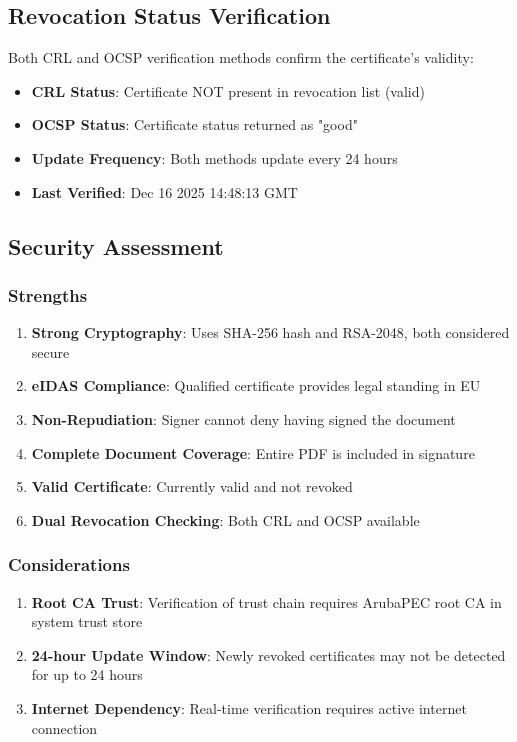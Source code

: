 \documentclass[12pt,a4paper]{article}
\begin{document}
\subsection{Revocation Status Verification}

Both CRL and OCSP verification methods confirm the certificate's validity:

\begin{itemize}
    \item \textbf{CRL Status}: Certificate NOT present in revocation list (valid)
    \item \textbf{OCSP Status}: Certificate status returned as "good"
    \item \textbf{Update Frequency}: Both methods update every 24 hours
    \item \textbf{Last Verified}: Dec 16 2025 14:48:13 GMT
\end{itemize}

\subsection{Security Assessment}

\subsubsection{Strengths}

\begin{enumerate}
    \item \textbf{Strong Cryptography}: Uses SHA-256 hash and RSA-2048, both considered secure
    \item \textbf{eIDAS Compliance}: Qualified certificate provides legal standing in EU
    \item \textbf{Non-Repudiation}: Signer cannot deny having signed the document
    \item \textbf{Complete Document Coverage}: Entire PDF is included in signature
    \item \textbf{Valid Certificate}: Currently valid and not revoked
    \item \textbf{Dual Revocation Checking}: Both CRL and OCSP available
\end{enumerate}

\subsubsection{Considerations}

\begin{enumerate}
    \item \textbf{Root CA Trust}: Verification of trust chain requires ArubaPEC root CA in system trust store
    \item \textbf{24-hour Update Window}: Newly revoked certificates may not be detected for up to 24 hours
    \item \textbf{Internet Dependency}: Real-time verification requires active internet connection
\end{enumerate}
\end{document}

